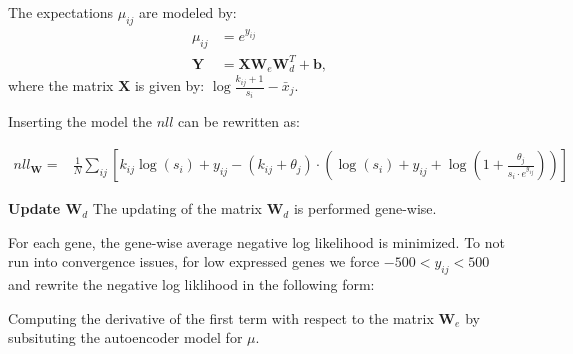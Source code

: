 \documentclass[11pt]{letter}
\newcommand{\matr}[1]{\mathbf{#1}}
\begin{document}
The expectations $\mu_{ij}$ are modeled by:
\begin{align*}
\mu_{ij} &= e^{y_{ij}} \\
\matr{Y} &= \matr{X} \matr{W}_e \matr{W}_d^T + \matr{b},
\end{align*}
where the matrix $\matr{X}$ is given by: $\log{\frac{k_{ij}+1}{s_i}} - \bar{x}_j$. 

Inserting the model the $nll$ can be rewritten as:

\begin{align*}
nll_{\matr{W}}=&  
\frac{1}{N} \sum_{ij} \left[ k_{ij} \log(s_i) + y_{ij} - (k_{ij} + \theta_j) \cdot \left( \log(s_i) + y_{ij} + \log(1 + \frac{\theta_j}{s_i \cdot e^{y_{ij}}}) \right) \right]
\end{align*}

\textbf{Update $\matr{W}_d$}
The updating of the matrix $\matr{W}_d$ is performed gene-wise.

For each gene, the gene-wise average negative log likelihood is minimized. 
To not run into convergence issues, for low expressed genes we force $-500 < y_{ij} < 500$ and rewrite the negative log liklihood in the following form:



Computing the derivative of the first term with respect to the matrix $\matr{W}_e$ by subsituting the autoencoder model for $\mu$. 

% 
\end{document}
